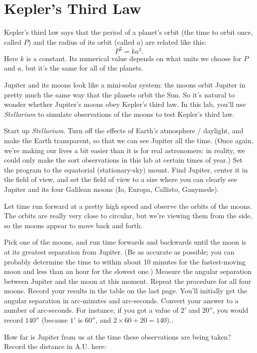 \chapter{Kepler's Third Law}


Kepler's third law says that the period of a planet's orbit
(the time to orbit once, called $P$) and the radius
of its orbit (called $a$) are related like this:
$$
P^2=ka^3.
$$
Here $k$ is a constant.  Its numerical value depends on what units
we choose for $P$ and $a$, but it's the same for all of the planets.

Jupiter and its moons look like a mini-solar system: the moons orbit
Jupiter in pretty much the same way that the planets orbit the Sun.
So it's natural to wonder whether Jupiter's moons obey Kepler's third
law.  In this lab, you'll use 
{\it Stellarium} to simulate
observations of the moons to test Kepler's third law.

Start up \textit{Stellarium}. Turn off the effects of Earth's
atmosphere / daylight, and make the Earth transparent, so that we can see
Jupiter all the time. (Once again, we're making our lives a bit easier than
it is for real astronomers: in reality, we could only make
the sort observations in this lab at certain times of year.)
Set the program to the equatorial (stationary-sky) mount.
Find Jupiter, center it in the field
of view, and set the field of view to a size where you can clearly 
see Jupiter and its four Galilean moons (Io, Europa, Callisto, Ganymede).

Let time run forward at a pretty high speed and observe the orbits of 
the moons.  The orbits are really very close to circular, but we're
viewing them from the side, so the moons appear to move back and forth.

Pick one of the moons, and run time forwards and backwards until the
moon is at its greatest separation from Jupiter.  (Be as accurate as
possible; you can probably determine the time to within about 10 minutes
for the fastest-moving moon and less than an hour for the slowest one.)
Measure the angular separation between Jupiter and the moon at this moment.
Repeat the procedure for all four moons.  Record your results in the table
on the last page.  You'll initially get the angular separation
in arc-minutes and arc-seconds.  Convert your answer to a number of 
arc-seconds.  For instance, if you got a value of $2'$ and $20''$, you
would record $140''$ (because $1'$ is $60''$, and $2\times 60+20=140$)..

How far is Jupiter from us at the time these observations are being taken?
Record the distance in A.U. here:

